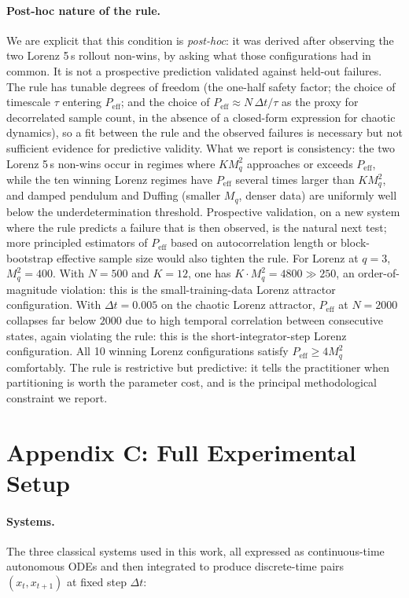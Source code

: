 \documentclass{article}
\begin{document}
\paragraph{Post-hoc nature of the rule.} We are explicit that this condition is \emph{post-hoc}: it was derived after observing the two Lorenz 5\,s rollout non-wins, by asking what those configurations had in common. It is not a prospective prediction validated against held-out failures. The rule has tunable degrees of freedom (the one-half safety factor; the choice of timescale $\tau$ entering $P_{\text{eff}}$; and the choice of $P_{\text{eff}} \approx N\,\Delta t/\tau$ as the proxy for decorrelated sample count, in the absence of a closed-form expression for chaotic dynamics), so a fit between the rule and the observed failures is necessary but not sufficient evidence for predictive validity. What we report is consistency: the two Lorenz 5\,s non-wins occur in regimes where $K M_q^2$ approaches or exceeds $P_{\text{eff}}$, while the ten winning Lorenz regimes have $P_{\text{eff}}$ several times larger than $K M_q^2$, and damped pendulum and Duffing (smaller $M_q$, denser data) are uniformly well below the underdetermination threshold. Prospective validation, on a new system where the rule predicts a failure that is then observed, is the natural next test; more principled estimators of $P_{\text{eff}}$ based on autocorrelation length or block-bootstrap effective sample size would also tighten the rule.
For Lorenz at $q{=}3$, $M_q^2 = 400$. With $N{=}500$ and $K{=}12$, one has $K\cdot M_q^2 = 4800 \gg 250$, an order-of-magnitude violation: this is the small-training-data Lorenz attractor configuration. With $\Delta t=0.005$ on the chaotic Lorenz attractor, $P_{\text{eff}}$ at $N{=}2000$ collapses far below $2000$ due to high temporal correlation between consecutive states, again violating the rule: this is the short-integrator-step Lorenz configuration. All 10 winning Lorenz configurations satisfy $P_{\text{eff}} \geq 4 M_q^2$ comfortably. The rule is restrictive but predictive: it tells the practitioner when partitioning is worth the parameter cost, and is the principal methodological constraint we report.

\section*{Appendix C: Full Experimental Setup}

\paragraph{Systems.} The three classical systems used in this work, all expressed as continuous-time autonomous ODEs and then integrated to produce discrete-time pairs $(x_t, x_{t+1})$ at fixed step $\Delta t$:
\end{document}
